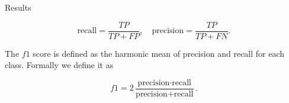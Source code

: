 \documentclass{beamer}
\begin{document}
\begin{frame}[t]{Results}
	\begin{figure}[h]
	\end{figure}
\begin{equation}\label{eq:recall}
\text{recall}= \frac{TP}{TP + FP}, \quad
\text{precision} = \frac{TP}{TP + FN}.
\end{equation}

\noindent The $f1$ score is defined as the harmonic mean of precision and recall for each class. Formally we define it as

\begin{equation}\label{eq:f1}
f1 = 2 \frac{\text{precision} \cdot \text{recall}}{\text{precision} + \text{recall}}.
\end{equation}
\end{frame}
\end{document}
